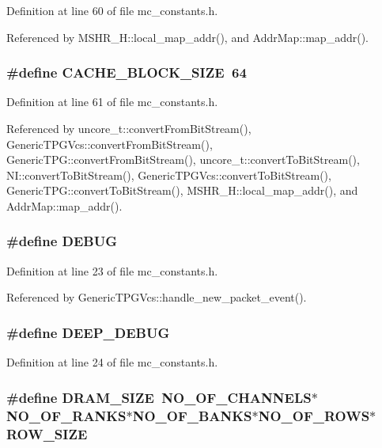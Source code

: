 Definition at line 60 of file mc\_\-constants.h.

Referenced by MSHR\_\-H::local\_\-map\_\-addr(), and AddrMap::map\_\-addr().
\subsubsection[{CACHE\_\-BLOCK\_\-SIZE}]{\setlength{\rightskip}{0pt plus 5cm}\#define {\bf CACHE\_\-BLOCK\_\-SIZE}~64}\label{mc__constants_8h_9e92828e1e7a7cc03003c00282384f96}




Definition at line 61 of file mc\_\-constants.h.

Referenced by uncore\_\-t::convertFromBitStream(), GenericTPGVcs::convertFromBitStream(), GenericTPG::convertFromBitStream(), uncore\_\-t::convertToBitStream(), NI::convertToBitStream(), GenericTPGVcs::convertToBitStream(), GenericTPG::convertToBitStream(), MSHR\_\-H::local\_\-map\_\-addr(), and AddrMap::map\_\-addr().
\subsubsection[{DEBUG}]{\setlength{\rightskip}{0pt plus 5cm}\#define DEBUG}\label{mc__constants_8h_d72dbcf6d0153db1b8d8a58001feed83}




Definition at line 23 of file mc\_\-constants.h.

Referenced by GenericTPGVcs::handle\_\-new\_\-packet\_\-event().
\subsubsection[{DEEP\_\-DEBUG}]{\setlength{\rightskip}{0pt plus 5cm}\#define DEEP\_\-DEBUG}\label{mc__constants_8h_98846f5e42d3145d826f8b664ec13f80}




Definition at line 24 of file mc\_\-constants.h.
\subsubsection[{DRAM\_\-SIZE}]{\setlength{\rightskip}{0pt plus 5cm}\#define {\bf DRAM\_\-SIZE}~{\bf NO\_\-OF\_\-CHANNELS}$\ast${\bf NO\_\-OF\_\-RANKS}$\ast${\bf NO\_\-OF\_\-BANKS}$\ast${\bf NO\_\-OF\_\-ROWS}$\ast${\bf ROW\_\-SIZE}}\label{mc__constants_8h_4e35909b44ea391fbb7bb146992bb84d}




